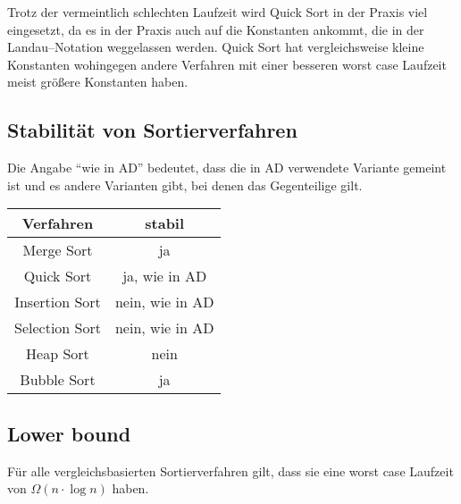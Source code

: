 \documentclass[10pt,a4paper,oneside,ngerman,numbers=noenddot]{scrartcl}
\begin{document}
		Trotz der vermeintlich schlechten Laufzeit wird Quick Sort in der Praxis viel eingesetzt, da es in der Praxis auch auf die Konstanten ankommt, die in der Landau--Notation weggelassen werden. Quick Sort hat vergleichsweise kleine Konstanten wohingegen andere Verfahren mit einer besseren worst case Laufzeit meist größere Konstanten haben.
		
		
	\subsection{Stabilität von Sortierverfahren}
		
		Die Angabe "`wie in AD"' bedeutet, dass die in AD verwendete Variante gemeint ist und es andere Varianten gibt, bei denen das Gegenteilige gilt.
		
		\begin{tabular}{c|c}
			Verfahren & stabil \\
			\hline
			Merge Sort & ja \\
			Quick Sort & ja, wie in AD \\
			Insertion Sort & nein, wie in AD \\
			Selection Sort & nein, wie in AD \\
			Heap Sort & nein \\
			Bubble Sort & ja
		\end{tabular}
		
	\subsection{Lower bound}
	
		Für alle vergleichsbasierten Sortierverfahren gilt, dass sie eine worst case Laufzeit von $\Omega(n \cdot \log n)$ haben.
		
	
\end{document}
